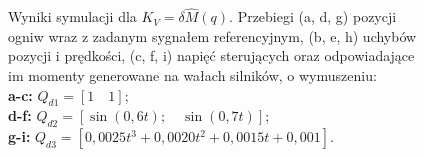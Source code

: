 \documentclass[12pt, a4paper, polish]{article}
\begin{document}
\begin{figure}[H]
{		Wyniki symulacji dla $K_V=\delta\hat{M}(q)$. Przebiegi (a, d, g) pozycji ogniw wraz z zadanym sygnałem referencyjnym, (b, e, h) uchybów pozycji i prędkości, (c, f, i)  napięć sterujących oraz odpowiadające im momenty generowane na wałach silników, o wymuszeniu:\\
		\textbf{a-c:} $Q_{d1}=[1\quad1]$;\\
		\textbf{d-f:} $Q_{d2}=[\sin(0,6t);\quad \sin(0,7t)]$;\\
		\textbf{g-i:} $Q_{d3}=[0,0025t^3+0,0020t^2+0,0015t+0,001]$.}
\end{figure}
\end{document}
